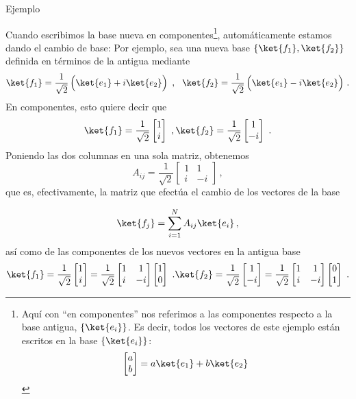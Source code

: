 \documentclass[a4paper,11pt]{book} %
\numberwithin{equation}{chapter}
\begin{document}
	\begin{mybox_green}{Ejemplo}

Cuando escribimos la base nueva en componentes\footnote{Aquí con ``en componentes'' nos referimos a las componentes respecto a la base antigua, $\{\ket{e_i}\}$. Es decir, todos los vectores de este ejemplo están escritos en la base $\{\ket{e_i}\}$:
$$
\begin{bmatrix}
a \\b
\end{bmatrix} = a \ket{e_1} + b \ket{e_2}
$$}, automáticamente estamos dando el cambio de base:
Por ejemplo, sea una nueva base $\{\ket{f_1},\ket{f_2}\}$ definida en términos de la antigua mediante 
$$
\ket{f_1} = \frac{1}{\sqrt{2}}\left(\rule{0mm}{4mm}\ket{e_1} + i\ket{e_2}\right)~,~~\ket{f_2} = \frac{1}{\sqrt{2}}\left( \rule{0mm}{4mm}\ket{e_1} - i\ket{e_2}\right)\, .
$$
En componentes, esto quiere decir que
$$
\ket{f_1} = \frac{1}{\sqrt{2}}\begin{bmatrix} 1 \\i \end{bmatrix}~,
\ket{f_2} = \frac{1}{\sqrt{2}}\begin{bmatrix} 1 \\-i \end{bmatrix}~.
$$
Poniendo las dos columnas en una sola matriz, obtenemos   
$$
A_{ij} = \frac{1}{\sqrt{2}}\begin{bmatrix} 1 & 1 \\ i & -i \end{bmatrix}\, ,
$$
que es, efectivamente, la matriz que efectúa el cambio de los vectores de la base

$$
\ket{f_j} = \sum_{i=1}^N A_{i j}\ket{e_{i}} \, ,
$$
así como de las componentes de los nuevos vectores en la antigua base
$$
\ket{f_1} = \frac{1}{\sqrt{2}}\begin{bmatrix} 1 \\i \end{bmatrix} = \frac{1}{\sqrt{2}}\begin{bmatrix} 1 & 1 \\ i & -i \end{bmatrix}\begin{bmatrix} 1 \\0 \end{bmatrix}~.
\ket{f_2} = \frac{1}{\sqrt{2}}\begin{bmatrix} 1 \\-i \end{bmatrix} = \frac{1}{\sqrt{2}}\begin{bmatrix} 1 & 1 \\ i & -i \end{bmatrix}\begin{bmatrix} 0 \\1 \end{bmatrix}~.
$$
	\end{mybox_green}
\end{document}
